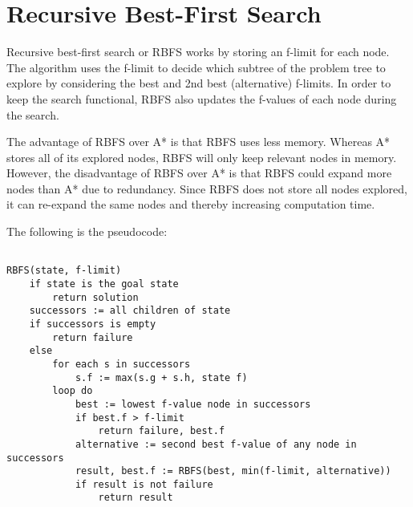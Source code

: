 \section{Recursive Best-First Search}

Recursive best-first search or RBFS works by storing an f-limit for each node. The algorithm uses the f-limit to decide which subtree of the problem tree to explore by considering the best and 2nd best (alternative) f-limits. In order to keep the search functional, RBFS also updates the f-values of each node during the search.

The advantage of RBFS over A* is that RBFS uses less memory. Whereas A* stores all of its explored nodes, RBFS will only keep relevant nodes in memory. However, the disadvantage of RBFS over A* is that RBFS could expand more nodes than A* due to redundancy. Since RBFS does not store all nodes explored, it can re-expand the same nodes and thereby increasing computation time.

The following is the pseudocode:

\begin{verbatim}

RBFS(state, f-limit)
    if state is the goal state 
        return solution
    successors := all children of state
    if successors is empty
        return failure
    else
        for each s in successors
            s.f := max(s.g + s.h, state f)
        loop do
            best := lowest f-value node in successors
            if best.f > f-limit
                return failure, best.f
            alternative := second best f-value of any node in successors
            result, best.f := RBFS(best, min(f-limit, alternative))
            if result is not failure
                return result
\end{verbatim}

